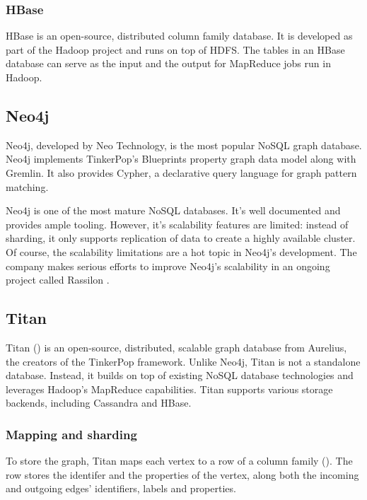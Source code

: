 \subsubsection{HBase}

HBase is an open-source, distributed column family database. It is developed as part of the Hadoop project and runs on top of HDFS. The tables in an HBase database can serve as the input and the output for MapReduce jobs run in Hadoop.

\subsection{Neo4j}
\label{subsec:neo4j}

Neo4j, developed by Neo Technology, is the most popular NoSQL graph database. Neo4j implements TinkerPop's Blueprints property graph data model along with Gremlin. It also provides Cypher, a declarative query language for graph pattern matching. 

Neo4j is one of the most mature NoSQL databases. It's well documented and provides ample tooling. However, it's scalability features are limited: instead of sharding, it only supports replication of data to create a highly available cluster. Of course, the scalability limitations are a hot topic in Neo4j's development. The company makes serious efforts to improve Neo4j's scalability in an ongoing project called Rassilon \cite{rassilon}.


\subsection{Titan}
\label{subsec:titan}

Titan () is an open-source, distributed, scalable graph database from Aurelius, the creators of the TinkerPop framework. Unlike Neo4j, Titan is not a standalone database. Instead, it builds on top of existing NoSQL database technologies and leverages Hadoop's MapReduce capabilities. Titan supports various storage backends, including Cassandra and HBase.


\subsubsection{Mapping and sharding}

To store the graph, Titan maps each vertex to a row of a column family (). The row stores the identifer and the properties of the vertex, along both the incoming and outgoing edges' identifiers, labels and properties.

